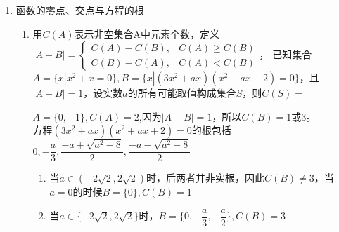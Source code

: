 \begin{enumerate}
\begin{enumerate}
    判断下列命题的真假, 并说明理由: 
    \begin{enumerate}
    \item 方程$f(g(x))=0$有且仅有6个根; 
    \item 方程$g(f(x))=0$有且仅有3个根; 
    \item 方程$f(f(x))=0$有且仅有5个根; 
    \item 方程$g(g(x))=0$有且仅有4个根. 
    \end{enumerate}
    \begin{jieda}
    $f(x)=0$的根可取近似值为$0,\pm1.5$; $g(x)=0$的根可取近似值为$-1.8,0.4$. 
    \begin{enumerate}
    \item $f(g(x))=0\iff g(x)=0,\pm1.5$, 结合$g(x)$的图像可得解的个数为$3+3=6$个. 
    \item $g(f(x))=0\iff f(x)=-1.8,0.4$, 结合$f(x)$的图像可得解的个数为$1+3=4$个. 
    \item $f(f(x))=0\iff f(x)=0,\pm1.5$, 结合$f(x)$的图像可得解的个数为$3+2=5$个. 
    \item $g(g(x))=0\iff g(x)=-1.8,0.4$, 结合$g(x)$的图像可得解的个数为$2+2=4$个. 
    \end{enumerate}
    综上, 只有(2)是假命题, 其他都是真命题. 
    \end{jieda}
    \end{enumerate}
    \item 函数的零点、交点与方程的根
    \begin{enumerate}
        \item 用$C(A)$表示非空集合A中元素个数，定义$|A-B| = \left \{ \begin{array}{ll}
             C(A)-C(B),& C(A) \geq C(B)  \\
             C(B)-C(A),& C(A) < C(B)
        \end{array}\right.$，
        已知集合$A = \{x | x^2 + x = 0\}, B = \{x | (3x^2+ax)(x^2+ax+2) = 0\}$，且$|A-B|=1$，设实数$a$的所有可能取值构成集合$S$，则$C(S) = $
        \begin{jieda}
            $A = \{0, -1\}, C(A) = 2$,因为$|A-B| = 1$，所以$C(B) = 1 \mbox{或} 3$。 \\
            方程$(3x^2+ax)(x^2+ax+2) = 0$的根包括$0, -\dfrac{a}{3}, \dfrac{-a+\sqrt{a^2-8}}{2}, \dfrac{-a-\sqrt{a^2-8}}{2}$ 
            \begin{enumerate}
                \item 当$a \in (-2\sqrt{2}, 2\sqrt{2})$时，后两者并非实根，因此$C(B) \neq 3$，当$a = 0$的时候$B = \{0\}, C(B) = 1$
                \item 当$a \in \{-2\sqrt{2}, 2\sqrt{2}\}$时，$B = \{0, -\dfrac{a}{3}, -\dfrac{a}{2}\}, C(B) = 3$

\end{enumerate}
\end{jieda}
\end{enumerate}
\end{enumerate}
